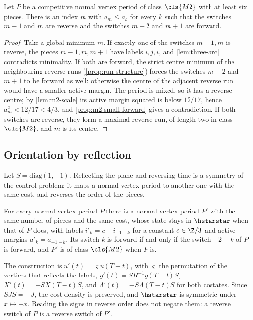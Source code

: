 \begin{proposition}\label{prop:m2-centre}
Let $P$ be a competitive normal vertex period of class $\cls{M2}$ with at least six pieces. There is
an index $m$ with $a_m\le a_k$ for every $k$ such that the switches $m-1$ and $m$ are reverse and the
switches $m-2$ and $m+1$ are forward.
\end{proposition}

\begin{proof}
Take a global minimum $m$. If exactly one of the switches $m-1,m$ is reverse, the pieces $m-1,m,m+1$
have labels $i,j,i$, and \cref{lem:three-arc} contradicts minimality. If both are forward, the
strict centre minimum of the neighbouring reverse runs (\cref{prop:run-structure}) forces the
switches $m-2$ and $m+1$ to be forward as well: otherwise the centre of the adjacent reverse run
would have a smaller active margin. The period is mixed, so it has a reverse centre; by
\cref{lem:m2-scale} its active margin squared is below $12/17$, hence $a_m^2<12/17<4/3$, and
\cref{prop:m2-small-forward} gives a contradiction. If both switches are reverse, they form a
maximal reverse run, of length two in class $\cls{M2}$, and $m$ is its centre.
\end{proof}

\subsection{Orientation by reflection}\label{sec:m2-reflection}

Let $S=\mathrm{diag}(1,-1)$. Reflecting the plane and reversing time is a symmetry of the control
problem: it maps a normal vertex period to another one with the same cost, and reverses the order of
the pieces.

\begin{lemma}[Reflection]\label{lem:m2-reflection}
For every normal vertex period $P$ there is a normal vertex period $P'$ with the same number of
pieces and the same cost, whose state stays in $\hstarstar$ when that of $P$ does, with labels
$i'_k=c-i_{-1-k}$ for a constant $c\in\Z/3$ and active margins $a'_k=a_{-1-k}$. Its switch $k$ is
forward if and only if the switch $-2-k$ of $P$ is forward, and $P'$ is of class $\cls{M2}$ when $P$
is.
\end{lemma}

The construction is $u'(t)=\varsigma u(T-t)$, with $\varsigma$ the permutation of the vertices that
reflects the labels, $g'(t)=SR^{-1}g(T-t)S$, $X'(t)=-SX(T-t)S$, and $\Lambda'(t)=-S\Lambda(T-t)S$ for
both costates. Since $SJS=-J$, the cost density is preserved, and $\hstarstar$ is symmetric under
$x\mapsto-x$. Reading the signs in reverse order does not negate them: a reverse switch of $P$
is a reverse switch of $P'$.

